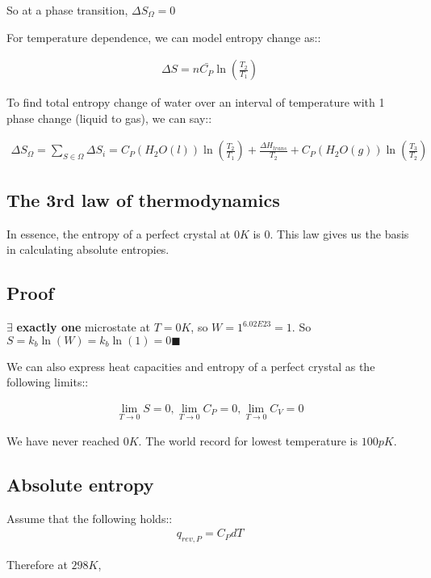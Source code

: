 \documentclass[12pt]{book}
\begin{document}
So at a phase transition, $\Delta S_{\Omega}=0$

For temperature dependence, we can model entropy change as::

\begin{align*}
    \Delta S=n\bar{C_P}\ln\left(\frac{T_2}{T_1}\right)
\end{align*}

To find total entropy change of water over an interval of temperature with 1 phase change (liquid to gas), we can say::

\begin{align*}
    \Delta S_{\Omega}=\sum_{S\in \Omega} \Delta S_i=C_P(H_2O(l))\ln\left(\frac{T_2}{T_1}\right)+\frac{\Delta H_{trans}}{T_2}+C_P(H_2O(g))\ln\left(\frac{T_3}{T_2}\right)
\end{align*}

\subsection*{The 3rd law of thermodynamics}

In essence, the entropy of a perfect crystal at $0K$ is 0. This law gives us the basis in calculating absolute entropies.

\subsection*{Proof}

$\exists$ \textbf{exactly one} microstate at $T=0K$, so $W=1^{6.02E23}=1$. So $S=k_b\ln(W)=k_b\ln(1)=0\blacksquare$

We can also express heat capacities and entropy of a perfect crystal as the following limits::

\begin{align*}
    \lim_{T\rightarrow 0}S=0, \lim_{T\rightarrow 0} C_P=0, \lim_{T\rightarrow 0} C_V=0
\end{align*}

We have never reached $0K$. The world record for lowest temperature is $100pK$.

\subsection*{Absolute entropy}
Assume that the following holds::
\begin{align*}
    q_{rev,P}=C_P dT
\end{align*}

Therefore at $298K$,
\end{document}
